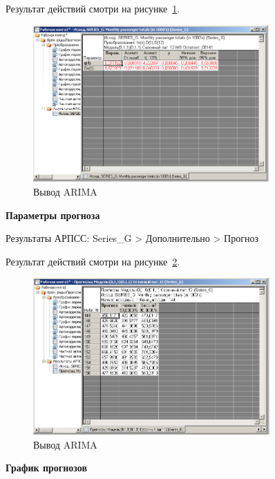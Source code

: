 Результат действий смотри на рисунке~\ref{fig:13}.

\begin{figure}[!h]
  \centering

  \includegraphics[height=6cm]
  {inc/13.PNG}

  \caption{Вывод ARIMA}

  \label{fig:13}
\end{figure}

\newpage

\begin{center}
  \textbf{Параметры прогноза}
\end{center}

Результаты АРПСС: Series\_G
> Дополнительно > Прогноз

Результат действий смотри на рисунке~\ref{fig:14}.

\begin{figure}[!h]
  \centering

  \includegraphics[height=6cm]
  {inc/14.PNG}

  \caption{Вывод ARIMA}

  \label{fig:14}
\end{figure}

\begin{center}
  \textbf{График прогнозов}
\end{center}

